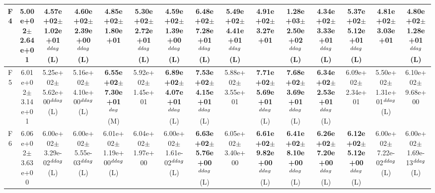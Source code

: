 \begin{table}[!t]
\begin{tabular}{c|cccccccccccccc}
F4  & 5.00e+02$\pm$2.64e+01  & 4.57e+02$\pm$1.02e+01$^{\\ddag}$ (L)  & 4.60e+02$\pm$2.39e+00$^{\\ddag}$ (L)  & 4.85e+02$\pm$1.80e+01   & \textbf{5.30e+02$\pm$2.72e+01}$^{\\ddag}$ (L)  & 4.59e+02$\pm$1.39e+00$^{\\ddag}$ (L)  & \textbf{6.48e+02$\pm$7.28e+01}$^{\\ddag}$ (L)  & \textbf{5.49e+02$\pm$4.41e+01}$^{\\ddag}$ (L)  & 4.91e+02$\pm$3.27e+01   & \textbf{1.28e+03$\pm$2.50e+02}$^{\\ddag}$ (L)  & 4.34e+02$\pm$3.33e+01$^{\\ddag}$ (L)  & \textbf{5.37e+02$\pm$5.12e+01}$^{\\ddag}$ (L)  & 4.81e+02$\pm$3.03e+01   & 4.80e+02$\pm$1.28e+01$^{\\ddag}$ (L) \\ \hline
F5  & 6.01e+02$\pm$3.14e+01  & 5.25e+02$\pm$5.62e+00$^{\\ddag}$ (L)  & 5.16e+02$\pm$4.10e+00$^{\\ddag}$ (L)  & \textbf{6.55e+02$\pm$7.30e+01}$^{\\dag}$ (M)  & 5.92e+02$\pm$1.45e+01   & \textbf{6.89e+02$\pm$4.07e+01}$^{\\ddag}$ (L)  & \textbf{7.53e+02$\pm$4.15e+01}$^{\\ddag}$ (L)  & 5.88e+02$\pm$3.55e+01   & \textbf{7.71e+02$\pm$5.69e+01}$^{\\ddag}$ (L)  & \textbf{7.68e+02$\pm$3.69e+01}$^{\\ddag}$ (L)  & \textbf{6.34e+02$\pm$2.53e+01}$^{\\ddag}$ (L)  & 6.09e+02$\pm$2.34e+01   & 5.50e+02$\pm$1.31e+01$^{\\ddag}$ (L)  & 6.10e+02$\pm$9.68e+00  \\ \hline
F6  & 6.06e+02$\pm$3.63e+00  & 6.00e+02$\pm$3.29e-02$^{\\ddag}$ (L)  & 6.00e+02$\pm$5.55e-03$^{\\ddag}$ (L)  & 6.01e+02$\pm$1.19e+00$^{\\ddag}$ (L)  & 6.04e+02$\pm$1.97e+00   & 6.00e+02$\pm$1.61e-02$^{\\ddag}$ (L)  & \textbf{6.63e+02$\pm$5.76e+00}$^{\\ddag}$ (L)  & 6.05e+02$\pm$3.40e+00   & \textbf{6.61e+02$\pm$9.82e+00}$^{\\ddag}$ (L)  & \textbf{6.41e+02$\pm$8.10e+00}$^{\\ddag}$ (L)  & \textbf{6.26e+02$\pm$7.20e+00}$^{\\ddag}$ (L)  & \textbf{6.12e+02$\pm$5.12e+00}$^{\\ddag}$ (L)  & 6.00e+02$\pm$7.22e-02$^{\\ddag}$ (L)  & 6.00e+02$\pm$1.69e-13$^{\\ddag}$ (L) \\ \hline

\end{tabular}
\end{table}

